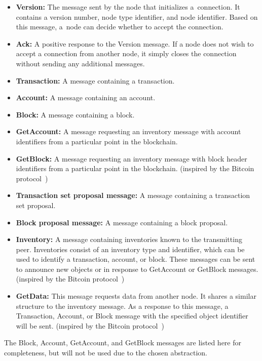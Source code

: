 \noindent\begin{itemize}
    \item \textbf{Version:}  The message sent by the node that initializes a~connection. It contains a version number, node type identifier, and node identifier. Based on this message, a~node can decide whether to accept the connection.
    \item \textbf{Ack:} A positive response to the Version message. If a node does not wish to accept a connection from another node, it simply closes the connection without sending any additional messages.
    \item \textbf{Transaction:} A message containing a transaction.
    \item \textbf{Account:} A message containing an account.
    \item \textbf{Block:} A message containing a block.
    \item \textbf{GetAccount:} A message requesting an inventory message with account identifiers from a particular point in the blockchain.
    \item \textbf{GetBlock:} A message requesting an inventory message with block header identifiers from a particular point in the blockchain. (inspired by the Bitcoin protocol~\cite{bitcoin.network.protocol})
    \item \textbf{Transaction set proposal message:} A message containing a transaction set proposal.
    \item \textbf{Block proposal message:} A message containing a block proposal.
    \item \textbf{Inventory:} A message containing inventories known to the transmitting peer. Inventories consist of an inventory type and identifier, which can be used to identify a transaction, account, or block. These messages can be sent to announce new objects or in response to GetAccount or GetBlock messages. (inspired by the Bitcoin protocol~\cite{bitcoin.network.protocol})
    \item \textbf{GetData:} This message requests data from another node. It shares a similar structure to the inventory message. As a response to this message, a Transaction, Account, or Block message with the specified object identifier will be sent. (inspired by the Bitcoin protocol~\cite{bitcoin.network.protocol})
\end{itemize}

The Block, Account, GetAccount, and GetBlock messages are listed here for completeness, but will not be used due to the chosen abstraction.

